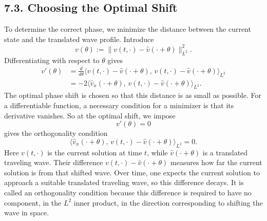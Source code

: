 \documentclass[11pt]{article}
\theoremstyle{definition}
\theoremstyle{remark}
\begin{document}
\subsection*{7.3. Choosing the Optimal Shift}
To determine the correct phase, we minimize the distance between the current state and the translated wave profile. Introduce
\[
v(\theta):=\|v(t,\cdot)-\hat v(\cdot+\theta)\|_{L^2}^2.
\]
Differentiating with respect to $\theta$ gives
\begin{align*}
v'(\theta)
&=
\frac{d}{d\theta}\langle v(t,\cdot)-\hat v(\cdot+\theta),\,v(t,\cdot)-\hat v(\cdot+\theta)\rangle_{L^2} \\
&=
-2\langle \hat v_x(\cdot+\theta),\,v(t,\cdot)-\hat v(\cdot+\theta)\rangle_{L^2}.
\end{align*}
The optimal phase shift is chosen so that this distance is as small as possible. For a differentiable function, a necessary condition for a minimizer is that its derivative vanishes. So at the optimal shift, we impose
\[
v'(\theta)=0
\]
gives the orthogonality condition
\[
\langle \hat v_x(\cdot+\theta),\,v(t,\cdot)-\hat v(\cdot+\theta)\rangle_{L^2}=0.
\]
Here $v(t,\cdot)$ is the current solution at time $t$, while $\hat v(\cdot+\theta)$ is a translated traveling wave. Their difference $v(t,\cdot)-\hat v(\cdot+\theta)$ measures how far the current solution is from that shifted wave. Over time, one expects the current solution to approach a suitable translated traveling wave, so this difference decays. It is called an orthogonality condition because this difference is required to have no component, in the $L^2$ inner product, in the direction corresponding to shifting the wave in space.
\end{document}
